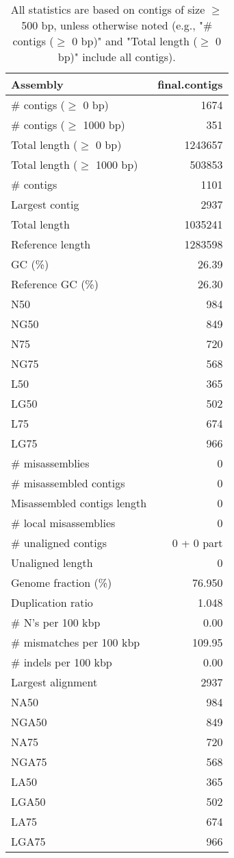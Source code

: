 \documentclass[12pt,a4paper]{article}
\begin{document}
\begin{table}[ht]
\begin{center}
\caption{All statistics are based on contigs of size $\geq$ 500 bp, unless otherwise noted (e.g., "\# contigs ($\geq$ 0 bp)" and "Total length ($\geq$ 0 bp)" include all contigs).}
\begin{tabular}{|l*{1}{|r}|}
\hline
Assembly & final.contigs \\ \hline
\# contigs ($\geq$ 0 bp) & 1674 \\ \hline
\# contigs ($\geq$ 1000 bp) & 351 \\ \hline
Total length ($\geq$ 0 bp) & 1243657 \\ \hline
Total length ($\geq$ 1000 bp) & 503853 \\ \hline
\# contigs & 1101 \\ \hline
Largest contig & 2937 \\ \hline
Total length & 1035241 \\ \hline
Reference length & 1283598 \\ \hline
GC (\%) & 26.39 \\ \hline
Reference GC (\%) & 26.30 \\ \hline
N50 & 984 \\ \hline
NG50 & 849 \\ \hline
N75 & 720 \\ \hline
NG75 & 568 \\ \hline
L50 & 365 \\ \hline
LG50 & 502 \\ \hline
L75 & 674 \\ \hline
LG75 & 966 \\ \hline
\# misassemblies & 0 \\ \hline
\# misassembled contigs & 0 \\ \hline
Misassembled contigs length & 0 \\ \hline
\# local misassemblies & 0 \\ \hline
\# unaligned contigs & 0 + 0 part \\ \hline
Unaligned length & 0 \\ \hline
Genome fraction (\%) & 76.950 \\ \hline
Duplication ratio & 1.048 \\ \hline
\# N's per 100 kbp & 0.00 \\ \hline
\# mismatches per 100 kbp & 109.95 \\ \hline
\# indels per 100 kbp & 0.00 \\ \hline
Largest alignment & 2937 \\ \hline
NA50 & 984 \\ \hline
NGA50 & 849 \\ \hline
NA75 & 720 \\ \hline
NGA75 & 568 \\ \hline
LA50 & 365 \\ \hline
LGA50 & 502 \\ \hline
LA75 & 674 \\ \hline
LGA75 & 966 \\ \hline
\end{tabular}
\end{center}
\end{table}
\end{document}

